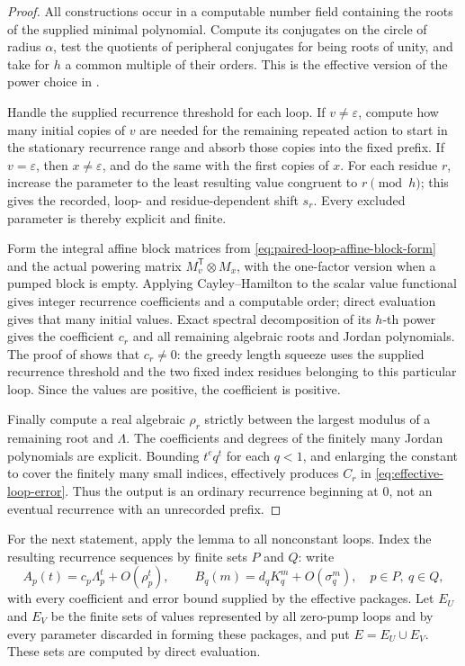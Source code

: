 \begin{proof}
  All constructions occur in a computable number field containing the roots
  of the supplied minimal polynomial. Compute its conjugates on the circle
  of radius \(\alpha\), test the quotients of peripheral conjugates for being
  roots of unity, and take for \(h\) a common multiple of their orders. This
  is the effective version of the power choice in
  .

  Handle the supplied recurrence threshold for each loop. If
  \(v\ne\varepsilon\), compute how many initial copies of \(v\) are
  needed for the remaining repeated action to start in the stationary
  recurrence range and absorb those copies into the fixed prefix. If
  \(v=\varepsilon\), then \(x\ne\varepsilon\), and do the same with the
  first copies of \(x\). For each residue \(r\), increase the parameter to
  the least resulting value congruent to \(r\pmod h\); this gives the
  recorded, loop- and residue-dependent shift \(s_r\). Every excluded
  parameter is thereby explicit and finite.

  Form the integral affine block matrices from
  \eqref{eq:paired-loop-affine-block-form} and the actual powering matrix
  \(M_v^{\mathsf T}\otimes M_x\), with the one-factor version when a pumped
  block is empty. Applying Cayley--Hamilton to the scalar value functional
  gives integer recurrence coefficients and a computable order; direct
  evaluation gives that many initial values. Exact spectral decomposition
  of its \(h\)-th power gives the coefficient \(c_r\) and all remaining
  algebraic roots and Jordan polynomials. The proof of
   shows that \(c_r\ne0\): the
  greedy length squeeze uses the supplied recurrence threshold and the two
  fixed index residues belonging to this particular loop. Since the values
  are positive, the coefficient is positive.

  Finally compute a real algebraic \(\rho_r\) strictly between the largest
  modulus of a remaining root and \(\Lambda\). The coefficients and degrees
  of the finitely many Jordan polynomials are explicit. Bounding
  \(t^e q^t\) for each \(q<1\), and enlarging the constant to cover the
  finitely many small indices, effectively produces \(C_r\) in
  \eqref{eq:effective-loop-error}. Thus the output is an ordinary recurrence
  beginning at \(0\), not an eventual recurrence with an unrecorded prefix.
\end{proof}

For the next statement, apply the lemma to all nonconstant loops. Index the
resulting recurrence sequences by finite sets \(P\) and \(Q\): write
\[
  A_p(t)=c_p\Lambda_p^t+O(\rho_p^t),\qquad
  B_q(m)=d_qK_q^m+O(\sigma_q^m),
  \quad p\in P,\ q\in Q,
\]
with every coefficient and error bound supplied by the effective packages.
Let \(E_U\) and \(E_V\) be the finite sets of values represented by all
zero-pump loops and by every parameter discarded in forming these packages,
and put \(E=E_U\cup E_V\). These sets are computed by direct evaluation.

